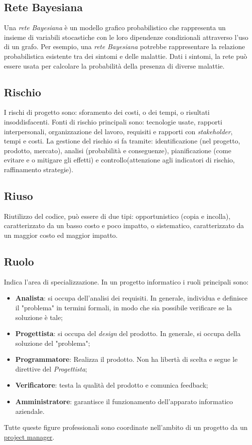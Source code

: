 	\subsection{Rete Bayesiana}
	\label{sec:retebayes}
	Una \emph{rete Bayesiana} è un modello grafico probabilistico che rappresenta un insieme di variabili stocastiche con le loro dipendenze condizionali attraverso l'uso di un grafo. Per esempio, una \emph{rete Bayesiana} potrebbe rappresentare la relazione probabilistica esistente tra dei sintomi e delle malattie. Dati i sintomi, la rete può essere usata per calcolare la probabilità della presenza di diverse malattie.

	
	\subsection{Rischio}
	\label{sec:rischio}
	I rischi di progetto sono: sforamento dei costi,  o dei tempi, o risultati insoddisfacenti. Fonti di rischio principali sono:
	tecnologie usate, rapporti interpersonali, organizzazione del lavoro, requisiti e rapporti con  \emph{stakeholder}, tempi e costi.
	La gestione del rischio si fa tramite:
	identificazione (nel progetto, prodotto, mercato), analisi (probabilità e conseguenze), pianificazione (come evitare e o mitigare gli effetti) e controllo(attenzione agli indicatori di rischio, raffinamento strategie).

	
	\subsection{Riuso}
	\label{sec:riuso}
	Riutilizzo del codice, può essere di due tipi: opportunistico (copia e incolla), caratterizzato da un basso costo e poco impatto, o sistematico, caratterizzato da un maggior costo ed maggior impatto.

	
	\subsection{Ruolo}
	\label{sec:ruolo}
	Indica l'area di specializzazione.
	In un progetto informatico i ruoli principali sono:
	\begin{itemize}
	\item \textbf{Analista}: si occupa dell'analisi dei requisiti. In generale, individua e definisce il "problema" in termini formali, in modo che sia possibile verificare se la soluzione è tale;
	\item \textbf{Progettista}: si occupa del \emph{design} del prodotto. In generale, si occupa della soluzione del "problema";
	\item \textbf{Programmatore}: Realizza il prodotto. Non ha libertà di scelta e segue le direttive del \emph{Progettista};
	\item \textbf{Verificatore}: testa la qualità del prodotto e comunica feedback;
	\item \textbf{Amministratore}: garantisce il funzionamento dell'apparato informatico aziendale.
	\end{itemize}
	Tutte queste figure professionali sono coordinate nell'ambito di un progetto da un \underline{\hyperref[sec:projectmanager]{project manager}}.
	

